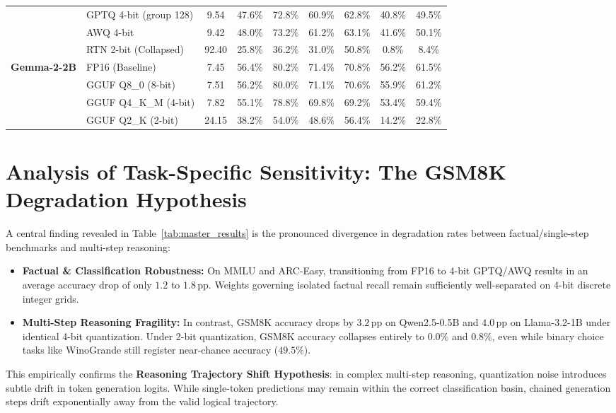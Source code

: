 \documentclass[12pt,a4paper,oneside]{report}
\begin{document}
\begin{table}[h!]
{\begin{tabular}{llccccccc}
& GPTQ 4-bit (group 128) & 9.54 & 47.6\% & 72.8\% & 60.9\% & 62.8\% & 40.8\% & 49.5\% \\
& AWQ 4-bit & 9.42 & 48.0\% & 73.2\% & 61.2\% & 63.1\% & 41.6\% & 50.1\% \\
& RTN 2-bit (Collapsed) & 92.40 & 25.8\% & 36.2\% & 31.0\% & 50.8\% & 0.8\% & 8.4\% \\
\midrule
\multirow{4}{*}{\textbf{Gemma-2-2B}} 
& FP16 (Baseline) & 7.45 & 56.4\% & 80.2\% & 71.4\% & 70.8\% & 56.2\% & 61.5\% \\
& GGUF Q8\_0 (8-bit) & 7.51 & 56.2\% & 80.0\% & 71.1\% & 70.6\% & 55.9\% & 61.2\% \\
& GGUF Q4\_K\_M (4-bit) & 7.82 & 55.1\% & 78.8\% & 69.8\% & 69.2\% & 53.4\% & 59.4\% \\
& GGUF Q2\_K (2-bit) & 24.15 & 38.2\% & 54.0\% & 48.6\% & 56.4\% & 14.2\% & 22.8\% \\
\bottomrule
\end{tabular}
}
\end{table}

\section{Analysis of Task-Specific Sensitivity: The GSM8K Degradation Hypothesis}
A central finding revealed in Table~\ref{tab:master_results} is the pronounced divergence in degradation rates between factual/single-step benchmarks and multi-step reasoning:
\begin{itemize}[leftmargin=*]
    \item \textbf{Factual & Classification Robustness:} On MMLU and ARC-Easy, transitioning from FP16 to 4-bit GPTQ/AWQ results in an average accuracy drop of only $1.2$ to $1.8\,\text{pp}$. Weights governing isolated factual recall remain sufficiently well-separated on 4-bit discrete integer grids.
    \item \textbf{Multi-Step Reasoning Fragility:} In contrast, GSM8K accuracy drops by $3.2\,\text{pp}$ on Qwen2.5-0.5B and $4.0\,\text{pp}$ on Llama-3.2-1B under identical 4-bit quantization. Under 2-bit quantization, GSM8K accuracy collapses entirely to $0.0\%$ and $0.8\%$, even while binary choice tasks like WinoGrande still register near-chance accuracy ($49.5\%$).
\end{itemize}
This empirically confirms the \textbf{Reasoning Trajectory Shift Hypothesis}: in complex multi-step reasoning, quantization noise introduces subtle drift in token generation logits. While single-token predictions may remain within the correct classification basin, chained generation steps drift exponentially away from the valid logical trajectory.
\end{document}
